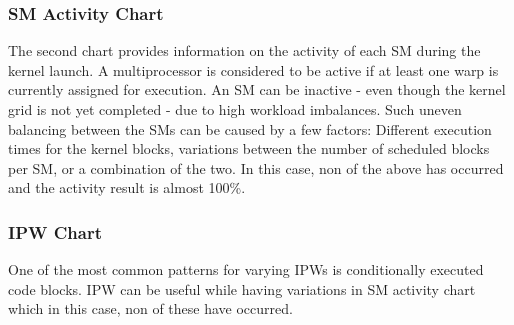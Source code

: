 \subsubsection{SM Activity Chart}
The second chart provides information on the activity of each SM during the kernel launch. A multiprocessor is considered to be active if at least one warp is currently assigned for execution. An SM can be inactive - even though the kernel grid is not yet completed - due to high workload imbalances. Such uneven balancing between the SMs can be caused by a few factors: Different execution times for the kernel blocks, variations between the number of scheduled blocks per SM, or a combination of the two. In this case, non of the above has occurred and the activity result is almost 100\%.

\subsubsection{IPW Chart}
One of the most common patterns for varying IPWs is conditionally executed code blocks. IPW can be useful while having variations in SM activity chart which in this case, non of these have occurred.

